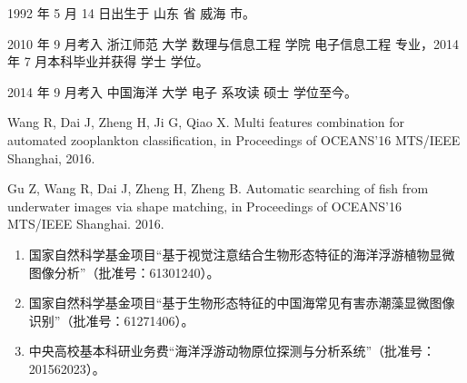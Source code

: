 \begin{resume}


  1992 年 5 月 14 日出生于 山东 省 威海 市。

  2010 年 9 月考入 浙江师范 大学 数理与信息工程 学院 电子信息工程 专业，2014 年 7 月本科毕业并获得 学士 学位。

  2014 年 9 月考入 中国海洋 大学 电子 系攻读 硕士 学位至今。


  \begin{publications}
    \item Wang R, Dai J, Zheng H, Ji G, Qiao X. Multi features combination for automated zooplankton classification, in Proceedings of OCEANS’16 MTS/IEEE Shanghai, 2016.
    \item Gu Z, Wang R, Dai J, Zheng H, Zheng B. Automatic searching of fish from underwater images via shape matching, in Proceedings of OCEANS’16 MTS/IEEE Shanghai. 2016.
  \end{publications}



  \begin{enumerate}
  \item 国家自然科学基金项目“基于视觉注意结合生物形态特征的海洋浮游植物显微图像分析”（批准号：61301240）。
  \item 国家自然科学基金项目“基于生物形态特征的中国海常见有害赤潮藻显微图像识别”（批准号：61271406）。
  \item 中央高校基本科研业务费“海洋浮游动物原位探测与分析系统”（批准号：201562023）。
  \end{enumerate}

\end{resume}
